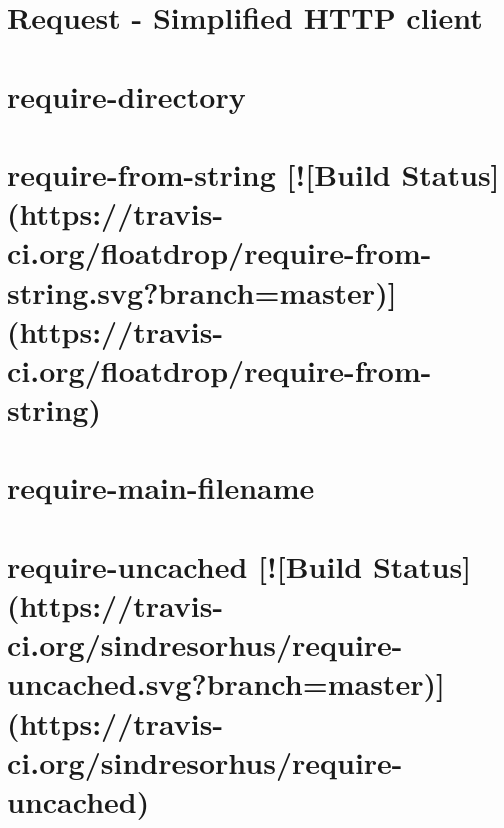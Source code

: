 \documentclass[twoside]{book}
\newcommand{\+}{\discretionary{\mbox{\scriptsize$\hookleftarrow$}}{}{}}
\begin{document}
\chapter{Request -\/ Simplified H\+T\+TP client}
\label{md__c_1_workspace_demo_src_main_script_node_modules_request__r_e_a_d_m_e}

\chapter{require-\/directory}
\label{md__c_1_workspace_demo_src_main_script_node_modules_require-directory__r_e_a_d_m_e}

\chapter{require-\/from-\/string \mbox{[}!\mbox{[}Build Status\mbox{]}(https\+://travis-\/ci.org/floatdrop/require-\/from-\/string.svg?branch=master)\mbox{]}(https\+://travis-\/ci.org/floatdrop/require-\/from-\/string)}
\label{md__c_1_workspace_demo_src_main_script_node_modules_require-from-string_readme}

\chapter{require-\/main-\/filename}
\label{md__c_1_workspace_demo_src_main_script_node_modules_require-main-filename__r_e_a_d_m_e}

\chapter{require-\/uncached \mbox{[}!\mbox{[}Build Status\mbox{]}(https\+://travis-\/ci.org/sindresorhus/require-\/uncached.svg?branch=master)\mbox{]}(https\+://travis-\/ci.org/sindresorhus/require-\/uncached)}
\label{md__c_1_workspace_demo_src_main_script_node_modules_require-uncached_readme}

\end{document}
